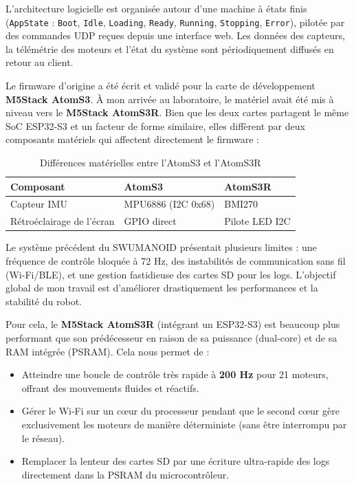 \documentclass{tropLaClasse}
\begin{document}
L'architecture logicielle est organisée autour d'une machine à états finis (\texttt{AppState} : \texttt{Boot}, \texttt{Idle}, \texttt{Loading}, \texttt{Ready}, \texttt{Running}, \texttt{Stopping}, \texttt{Error}), pilotée par des commandes UDP reçues depuis une interface web. Les données des capteurs, la télémétrie des moteurs et l'état du système sont périodiquement diffusés en retour au client.

Le firmware d'origine a été écrit et validé pour la carte de développement \textbf{M5Stack AtomS3}. À mon arrivée au laboratoire, le matériel avait été mis à niveau vers le \textbf{M5Stack AtomS3R}. Bien que les deux cartes partagent le même SoC ESP32-S3 et un facteur de forme similaire, elles diffèrent par deux composants matériels qui affectent directement le firmware :

\begin{table}[h!]
\centering
\begin{tabular}{lll}
\toprule
\textbf{Composant} & \textbf{AtomS3} & \textbf{AtomS3R} \\
\midrule
Capteur IMU        & MPU6886 (I2C 0x68) & BMI270 \\
Rétroéclairage de l'écran & GPIO direct        & Pilote LED I2C\\
\bottomrule
\end{tabular}
\caption{Différences matérielles entre l'AtomS3 et l'AtomS3R}
\end{table}

Le système précédent du SWUMANOID présentait plusieurs limites : une fréquence de contrôle bloquée à 72 Hz, des instabilités de communication sans fil (Wi-Fi/BLE), et une gestion fastidieuse des cartes SD pour les logs. L'objectif global de mon travail est d'améliorer drastiquement les performances et la stabilité du robot.

Pour cela, le \textbf{M5Stack AtomS3R} (intégrant un ESP32-S3) est beaucoup plus performant que son prédécesseur en raison de sa puissance (dual-core) et de sa RAM intégrée (PSRAM). Cela nous permet de :
\begin{itemize}
    \item Atteindre une boucle de contrôle très rapide à \textbf{200 Hz} pour 21 moteurs, offrant des mouvements fluides et réactifs.
    \item Gérer le Wi-Fi sur un cœur du processeur pendant que le second cœur gère exclusivement les moteurs de manière déterministe (sans être interrompu par le réseau).
    \item Remplacer la lenteur des cartes SD par une écriture ultra-rapide des logs directement dans la PSRAM du microcontrôleur.
\end{itemize}
\end{document}
